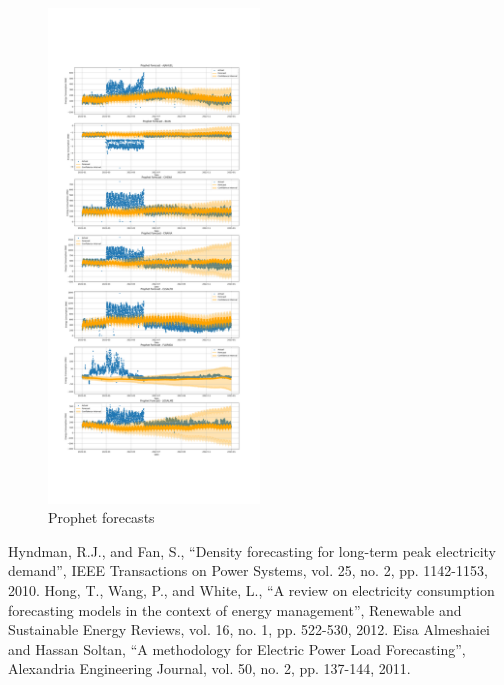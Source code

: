 \documentclass{ieeeaccess}
\begin{document}
\begin{enumerate}
\begin{figure}[h]
	\centering
	\includegraphics[width=0.5\textwidth]{prophet_forecast.png}
	\caption{Prophet forecasts}
	\label{fig:figure_prophet_forecast}
\end{figure}

\end{enumerate}



\appendix


\printbibliography

\begin{thebibliography}{00}

     Hyndman, R.J., and Fan, S., ``Density forecasting for long-term peak electricity demand'', IEEE Transactions on Power Systems, vol. 25, no. 2, pp. 1142-1153, 2010.
     Hong, T., Wang, P., and White, L., ``A review on electricity consumption forecasting models in the context of energy management'', Renewable and Sustainable Energy Reviews, vol. 16, no. 1, pp. 522-530, 2012.
     Eisa Almeshaiei and Hassan Soltan, ``A methodology for Electric Power Load Forecasting'', Alexandria Engineering Journal, vol. 50, no. 2, pp. 137-144, 2011.
    
\end{thebibliography}    


\EOD
\end{document}
